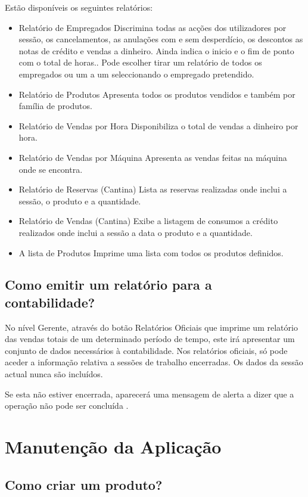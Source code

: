 \documentclass[a4paper,11pt,openany]{memoir}
\begin{document}
Estão disponíveis os seguintes relatórios:
\begin{itemize}
\item Relatório de Empregados
Discrimina todas as acções dos utilizadores por sessão, os
cancelamentos, as anulações com e sem desperdício, os descontos as notas
de crédito e vendas a dinheiro. Ainda indica o inicio e o fim de ponto com o
total de horas.. Pode escolher tirar um relatório de todos os empregados ou
um a um seleccionando o empregado pretendido.
\item  Relatório de Produtos
Apresenta todos os produtos vendidos e também por família de produtos.
\item  Relatório de Vendas por Hora
Disponibiliza o total de vendas a dinheiro por hora.
\item  Relatório de Vendas por Máquina
Apresenta as vendas feitas na máquina onde se encontra.
\item  Relatório de Reservas (Cantina)
Lista as reservas realizadas onde inclui a sessão, o produto e a quantidade.
\item  Relatório de Vendas (Cantina)
Exibe a listagem de consumos a crédito realizados onde inclui a sessão a
data o produto e a quantidade.
\item  A lista de Produtos
Imprime uma lista com todos os produtos definidos.
\end{itemize}

\section{Como emitir um relatório para a contabilidade?}
No nível Gerente, através do botão Relatórios Oficiais que imprime um relatório das
vendas totais de um determinado período de tempo, este irá apresentar um conjunto
de dados necessários à contabilidade. Nos relatórios oficiais, só pode aceder a
informação relativa a sessões de trabalho encerradas. Os dados da sessão actual
nunca são incluídos.

Se esta não estiver encerrada, aparecerá uma mensagem de
alerta a dizer que a operação não pode ser concluída .


\chapter{Manutenção da Aplicação}

\section{Como criar um produto?}
\end{document}
